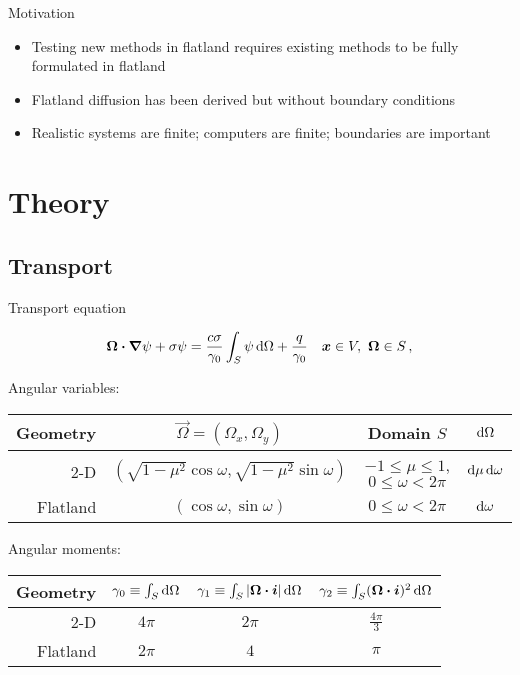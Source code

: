 \documentclass{beamer}
\begin{document}
\begin{frame}{Motivation}
  \begin{itemize}
    \item Testing new methods in flatland requires existing methods to be fully
      formulated in flatland
    \item Flatland diffusion has been derived \cite{Asa2008} but without
      boundary conditions
    \item Realistic systems are finite; computers are finite; boundaries are
      important
  \end{itemize}
\end{frame}

\section{Theory}
\subsection{Transport}
\begin{frame}{Transport equation}

\begin{equation}\label{eq:generalTransport}
  \bm{\Omega}\bm{\cdot} \bm{\nabla} \psi + \sigma \psi
  = \frac{c \sigma}{\gamma_0} \int_{S} \psi \mathop{}\!\mathrm{d}\Omega + \frac{q}{\gamma_0}
  \quad \bm{x}\in V,\ \bm{\Omega}\in S \,,
\end{equation}

  \vspace{2ex}

  \small
  \centering
  Angular variables:

  \begin{tabular}{rccc}
\toprule
   Geometry & $\vec{\Omega}=(\Omega_x, \Omega_y)$ & Domain $S$ & $\mathop{}\!\mathrm{d}\Omega$
\\ \midrule
2-D & $( \sqrt{1-\mu^2} \cos \omega,
   \sqrt{1-\mu^2} \sin \omega)$
   & $-1 \le \mu \le 1$, $0 \le \omega < 2\pi$ & $\mathop{}\!\mathrm{d}\mu \mathop{}\!\mathrm{d} \omega$
   \\
   Flatland & $ ( \cos \omega, \sin \omega )$
   & $0 \le \omega < 2\pi$ & $\mathop{}\!\mathrm{d} \omega$
\\ \bottomrule
  \end{tabular}

  \vspace{2ex}

Angular moments:

  \begin{tabular}{rccc}
\toprule
   Geometry
   & $\gamma_0 \equiv \int_S \mathop{}\!\mathrm{d}\Omega$
   & $\gamma_1 \equiv \int_S \left| \bm{\Omega}\bm{\cdot}\bm{i} \right| \mathop{}\!\mathrm{d}\Omega$
   & $\gamma_2 \equiv \int_S (\bm{\Omega}\bm{\cdot}\bm{i})^2 \mathop{}\!\mathrm{d}\Omega$
\\ \midrule
   2-D & $4\pi$ & $2\pi$ & $\frac{4\pi}{3}$
   \\
   Flatland & $2\pi$ & $4$ & $\pi$
\\ \bottomrule
  \end{tabular}

\end{frame}
\end{document}
